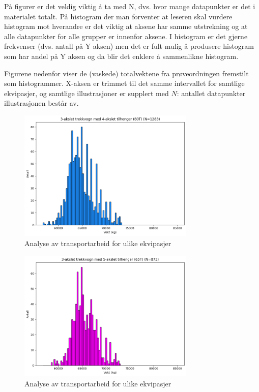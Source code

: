 \begin{formal}
På figurer er det veldig viktig å ta med N, dvs. hvor mange datapunkter er det i materialet totalt.
På histogram der man forventer at leseren skal vurdere histogram mot hverandre er det viktig at aksene har samme utstrekning og at alle datapunkter for alle grupper er innenfor aksene. I histogram er det gjerne frekvenser (dvs. antall på Y aksen) men det er fult mulig å produsere histogram som har andel på Y aksen og da blir det enklere å sammenlikne histogram.
\end{formal}

Figurene nedenfor viser de (vaskede) totalvektene fra prøveordningen fremstilt som histogrammer.
X-aksen er trimmet til det samme intervallet for samtlige ekvipasjer, og samtlige illustrasjoner er
supplert med $N$: antallet datapunkter illustrasjonen består av.

\begin{figure}[H]
    \centering
    \includegraphics[width=0.75\textwidth]{images/n60.png}
    \caption{Analyse av transportarbeid for ulike ekvipasjer}
    \label{fig:n60}
\end{figure}

\begin{figure}[H]
    \centering
    \includegraphics[width=0.75\textwidth]{images/n65.png}
    \caption{Analyse av transportarbeid for ulike ekvipasjer}
    \label{fig:n65}
\end{figure}

